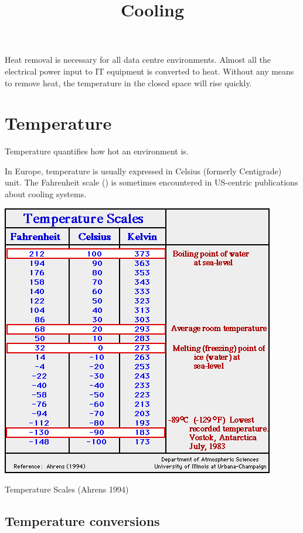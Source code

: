 \documentclass{pgnotes}
\title{Cooling}
\begin{document}
\maketitle


Heat removal is necessary for all data centre environments.
Almost all the electrical power input to IT equipment is converted to heat.
Without any means to remove heat, the temperature in the closed space will rise quickly.

\section{Temperature}
\label{sec:temperature}

Temperature quantifies how hot an environment is.

In Europe, temperature is usually expressed in Celsius (formerly Centigrade) unit.
The Fahrenheit scale (\si{\fahrenheit}) is sometimes encountered in US-centric publications about cooling systems.

\begin{table}[htbp]
  \centering
  \includegraphics[width=0.5\linewidth]{temp_scales_ahrens}
  \caption{Temperature Scales (Ahrens 1994)}
  \label{tab:temp-scales}
\end{table}

\subsection{Temperature conversions}
\label{sec:temperature-conversions}
\end{document}
